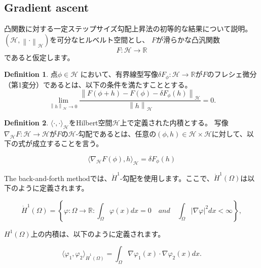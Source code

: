 \documentclass{jsarticle}
\theoremstyle{definition}
\newtheorem{dfn}{Definition}[section]
\begin{document}
\subsection{Gradient ascent}
凸関数に対する一定ステップサイズ勾配上昇法の初等的な結果について説明。
$(\mathcal{H} , \left\lVert \cdot  \right\rVert_\mathcal{H})$を可分なヒルベルト空間とし、 $F$が滑らかな凸汎関数
\begin{equation*}
  F: \mathcal{H} \to \mathbb{R}
\end{equation*}
であると仮定します。

\begin{dfn}
  点$\phi \in \mathcal{H}$ において、有界線型写像$\delta F_\phi: \mathcal{H} \to \mathbb{R}$が$F$のフレシェ微分（第1変分）であるとは、以下の条件を満たすこととする。
  \begin{equation*}
    \lim_{\left\lVert h \right\rVert_{\mathcal{H}} \to 0} \frac{\left\lVert F(\phi + h) - F(\phi) - \delta F_\phi (h) \right\rVert_{\mathcal{H}}}{\left\lVert h \right\rVert_{\mathcal{H}}} = 0.
  \end{equation*}
\end{dfn}


\begin{dfn}
  \label{dfn:inner product}
  $\langle \cdot, \cdot \rangle_\mathcal{H}$をHilbert空間$\mathcal{H}$上で定義された内積とする。
  写像$\nabla_\mathcal{H} F: \mathcal{H} \to \mathcal{H} $が$F$の$\mathcal{H}$-勾配であるとは、任意の$(\phi, h) \in \mathcal{H} \times \mathcal{H}$に対して、以下の式が成立することを言う。

  \begin{equation*}
    \langle \nabla_\mathcal{H} F(\phi), h \rangle_\mathcal{H} = \delta F_\phi(h)
  \end{equation*}

\end{dfn}

The back-and-forth methodでは、$\dot{H}^1$-勾配を使用します。ここで、$\dot{H}^1(\Omega)$は以下のように定義されます。

\begin{equation}
\dot{H}^1(\Omega) = \left\{ \varphi: \Omega \rightarrow \mathbb{R} : \int_\Omega \varphi(x) dx = 0 \quad and \quad \int_{\Omega} |\nabla \varphi|^2 dx < \infty \right\},
\end{equation}


$H^1(\Omega)$上の内積は、以下のように定義されます。

\begin{equation*}
\langle \varphi_1, \varphi_2 \rangle_{\dot{H}^1(\Omega)} = \int_{\Omega} \nabla \varphi_1(x) \cdot \nabla \varphi_2(x) dx.
\end{equation*}
\end{document}
